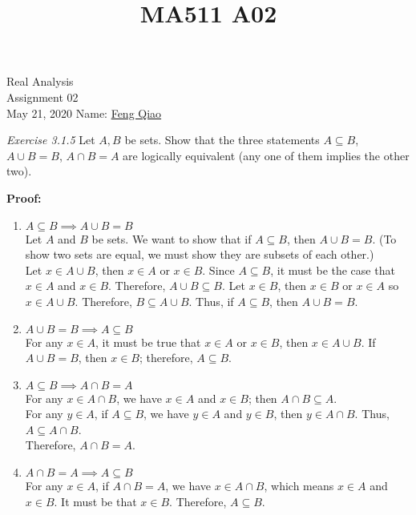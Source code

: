 \documentclass[12pt]{article}
\title{MA511 A02}
\begin{document}
\begin{flushleft}
{\sc \Large Real Analysis} \\ 
\medskip
Assignment 02\\
May 21, 2020
\hfill Name: \underline{Feng Qiao} \\

\setdefaultleftmargin{0pt}{}{}{}{}{}

\textit{Exercise 3.1.5} Let \(A,B\) be sets. Show that the three statements \(A\subseteq B\), \(A \cup B = B\), \(A \cap B = A\) are logically equivalent (any one of them implies the other two).

\textbf{Proof:}
\renewcommand{\labelenumi}{\alph{enumi})}
\renewcommand{\labelenumii}{\arabic{enumii})}
\begin{enumerate}
    \item \(A \subseteq B \implies A \cup B = B\) \\
    Let \(A\) and $B$ be sets. %
    We want to show that if \(A\subseteq B\), then \(A\cup B=B\).  (To show two sets are equal, we must show they are subsets of each other.)\\
    Let \(x\in A\cup B\), then \(x\in A\) or \(x\in B\).  Since \(A\subseteq B\), it must be the case that \(x\in A\) and \(x\in B\).  Therefore, \(A\cup B\subseteq B\).
    Let \(x\in B\), then \(x\in B\) or \(x\in A\) so \(x\in A\cup B\).  Therefore, \(B\subseteq A\cup B\).  Thus, if \(A\subseteq B\), then \(A\cup B=B\).

    \item \( A \cup B = B \implies  A \subseteq B\) \\
    For any \(x \in A\), it must be true that \(x \in A \) or \(x \in B\), then \(x \in A \cup B\). If \(A \cup B = B\), then \(x \in B\); therefore, \(A \subseteq B\).

    \item \(A \subseteq B \implies A \cap B =A\)\\
    For any \(x \in A \cap B\), we have \(x \in A\) and \(x \in B\); then \(A \cap B \subseteq A\).\\
    For any \(y \in A\), if \(A \subseteq B\), we have \(y \in A \) and \(y \in B\), then \(y \in A \cap B\). Thus, \(A \subseteq A \cap B\).\\
    Therefore, \(A \cap B = A\).

    \item \(A \cap B =A \implies  A \subseteq B\)\\
    For any \(x \in A\), if \(A \cap B =A\), we have \(x \in A \cap B\), which means \(x \in A\) and \(x \in B\). It must be that \(x \in B\). Therefore, \(A \subseteq B\).


\end{enumerate}
\end{flushleft}
\end{document}
